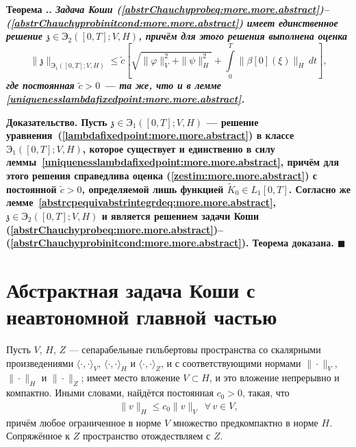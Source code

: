 \documentclass{report}
\newcounter{rem}[section]
\newcounter{lem}[section]
\newcounter{theor}[section]
\renewcommand{\thetheor}{\thesection.\arabic{theor}}
\newenvironment{Theorem}{\par\refstepcounter{theor}\bf Теорема \thetheor. \it}{\rm\par}
\newenvironment{Proof}{\par\noindent\bf Доказательство.\rm}{ $\blacksquare$\par}
\begin{document}
\begin{Theorem}\label{abstract_Cauchy_problem:unique_existence_theorem:more.more.abstract}
Задача Коши (\ref{abstrChauchyprobeq:more.more.abstract})--(\ref{abstrChauchyprobinitcond:more.more.abstract}) имеет единственное решение ${\mathfrak{z}}\in{\textbf{Э}}_2([0,T];V,H)$,
причём для этого решения выполнена оценка
\begin{equation}\label{zestim:more.more.abstract}
\|{\mathfrak{z}}\|_{{\textbf{Э}}_1([0,T];V,H)}\leqslant\tilde c\left[\sqrt{\|\varphi\|^2_V+\|\psi\|_H^2}+ \int\limits_{0}^{T}\|\beta[0](\xi)\|_H\,dt\right],
\end{equation}
где постоянная $\tilde c>0$ --- та же, что и в лемме \ref{uniquenesslambdafixedpoint:more.more.abstract}.
\end{Theorem}
\begin{Proof}
Пусть ${\mathfrak{z}}\in{\textbf{Э}}_1([0,T];V,H)$ --- решение уравнения~({\ref{lambdafixedpoint:more.more.abstract}}) в классе ${\textbf{Э}}_1([0,T];V,H)$, которое существует и единственно
в силу леммы~\ref{uniquenesslambdafixedpoint:more.more.abstract}, причём для этого решения справедлива оценка (\ref{zestim:more.more.abstract}) с постоянной $\tilde{c}>0$, определяемой лишь
функцией $\tilde{K}_0\in L_1[0,T]$. Согласно же лемме~\ref{abstrcpequivabstrintegrdeq:more.more.abstract}, ${\mathfrak{z}}\in{\textbf{Э}}_2([0,T];V,H)$ и является решением задачи Коши
(\ref{abstrChauchyprobeq:more.more.abstract})--(\ref{abstrChauchyprobinitcond:more.more.abstract}). Теорема доказана.
\end{Proof}

    \section{Абстрактная задача Коши с неавтономной главной частью}
Пусть $V$, $H$, $Z$ --- сепарабельные гильбертовы пространства со скалярными произведениями $\langle\cdot,\cdot\rangle_V$,  $\langle\cdot,\cdot\rangle_H$  и  $\langle\cdot,\cdot\rangle_Z$, и с соответствующими нормами $\|\cdot\|_V$, $\|\cdot\|_H$ и $\|\cdot\|_Z$;
имеет место вложение $V\subset H$, и это вложение непрерывно и компактно. Иными словами, найдётся постоянная $c_0>0$, такая, что
\begin{gather*}
\|v\|_H\leqslant c_0\|v\|_V\,\,\,\forall\,v\in V,
\end{gather*}
причём любое ограниченное в норме $V$ множество предкомпактно в норме $H$. Сопряжённое к $Z$ пространство отождествляем с $Z$.
\end{document}

